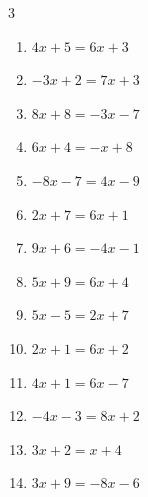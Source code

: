 \begin{multicols}{3}
\begin{enumerate}
  \item $4x+5=6x+3$

        \phantom{$\displaystyle x=1$}

  \item $-3x+2=7x+3$


  \item $8x+8=-3x-7$


  \item $6x+4=-x+8$


  \item $-8x-7=4x-9$


  \item $2x+7=6x+1$


  \item $9x+6=-4x-1$


  \item $5x+9=6x+4$

        \phantom{$\displaystyle x=5$}

  \item $5x-5=2x+7$

        \phantom{$\displaystyle x=4$}

  \item $2x+1=6x+2$


  \item $4x+1=6x-7$

        \phantom{$\displaystyle x=4$}

  \item $-4x-3=8x+2$


\columnbreak %

  \item $3x+2=x+4$

        \phantom{$\displaystyle x=1$}

  \item $3x+9=-8x-6$



\end{enumerate}
\end{multicols}
